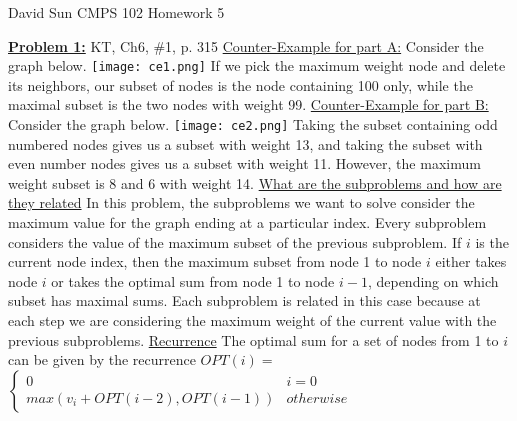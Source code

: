 \documentclass[11pt]{article}
\begin{document}
	\begin{flushleft}
		David Sun \newline
		CMPS 102  \newline
		Homework 5\newline
		
		\textbf{\underline{Problem 1:}} KT, Ch6, \#1, p. 315 \newline
		\underline{Counter-Example for part A:} Consider the graph below.
		\newline
		\texttt{[image: ce1.png]}
		\newline
		If we pick the maximum weight node and delete its neighbors, our subset of nodes is the node containing 100 only, while the maximal subset is the two nodes with weight 99.  
		\newline
		\newline
		\underline{Counter-Example for part B:} Consider the graph below. 
		\texttt{[image: ce2.png]}
		\newline
		Taking the subset containing odd numbered nodes gives us a subset with weight 13, and taking the subset with even number nodes gives us a subset with weight 11. However, the maximum weight subset is 8 and 6 with weight 14. 
		\newline
		\newline
		\underline{What are the subproblems and how are they related}
		\newline
		In this problem, the subproblems we want to solve consider the maximum value for the graph ending at a particular index. 
		\newline
		Every subproblem considers the value of the maximum subset of the previous subproblem. If $i$ is the current node index, then the maximum subset from node 1 to node $i$ either takes node $i$ or takes the optimal sum from node 1 to node $i - 1$, depending on which subset has maximal sums. Each subproblem is related in this case because at each step we are considering the maximum weight of the current value with the previous subproblems.
		\newline\newline
		\underline{Recurrence}
		\newline
		The optimal sum for a set of nodes from 1 to $i$ can be given by the recurrence \newline
		$OPT(i) =$
		$\begin{cases} 
			0 & i = 0 \\
			max(v_i + OPT(i - 2), OPT(i - 1)) & otherwise
		\end{cases}$ \newline

\end{flushleft}
\end{document}
